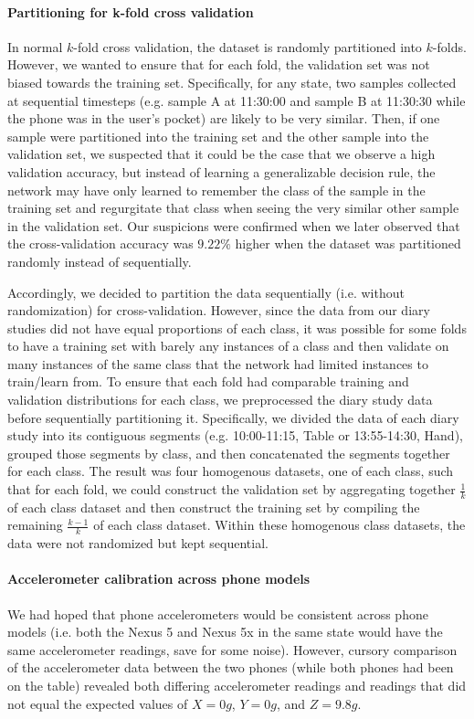 \paragraph{Partitioning for k-fold cross validation}
In normal $k$-fold cross validation, the dataset is randomly partitioned into
$k$-folds. However, we wanted to ensure that for each fold, the validation set
was not biased towards the training set. Specifically, for any state, two samples collected at sequential timesteps
(e.g. sample A at 11:30:00 and sample B at 11:30:30 while the phone was in 
the user's pocket) are likely to be very similar. Then, if one sample 
were partitioned into the training set and the other sample into the validation set, we suspected
that it could be the case that we observe a high validation accuracy, but instead of learning 
a generalizable decision rule, the network may have only learned to remember the class of the sample in the training set 
and regurgitate that class when seeing the very similar other sample in the validation set. 
Our suspicions were confirmed when we later observed that the cross-validation accuracy
was $9.22\%$ higher when the dataset was partitioned randomly instead of sequentially.

Accordingly, we decided to partition the data sequentially (i.e. without randomization)
for cross-validation. However, since the data from our diary studies
did not have equal proportions of each class, it was possible for some folds
to have a training set with barely any instances of a class and then validate
on many instances of the same class that the network had limited instances
to train/learn from. To ensure that each fold had comparable training and validation distributions 
for each class, we preprocessed the diary study data before sequentially partitioning it. 
Specifically, we divided the data of each diary study into its 
contiguous segments (e.g. 10:00-11:15, Table or 13:55-14:30, Hand), grouped 
those segments by class, and then concatenated the segments together for each class. The result was four 
homogenous datasets, one of each class, such that for each fold, we could construct
the validation set by aggregating together $\frac{1}{k}$ of each class dataset and then
construct the training set by compiling the remaining $\frac{k - 1}{k}$ of each class dataset.
Within these homogenous class datasets, the data were not randomized but 
kept sequential.

\paragraph{Accelerometer calibration across phone models}
We had hoped that phone accelerometers would be consistent across phone models (i.e.
both the Nexus 5 and Nexus 5x in the same state would have the same accelerometer
readings, save for some noise). However, cursory comparison of the accelerometer data between the two phones 
(while both phones had been on the table) revealed both differing accelerometer readings and readings
that did not equal the expected values of $X = 0g$, $Y = 0g$, and $Z = 9.8g$. 


